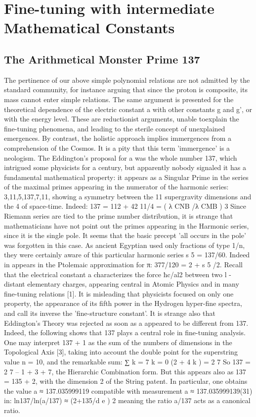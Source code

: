 \chapter{Fine-tuning with intermediate Mathematical Constants}

\section {The Arithmetical Monster Prime 137}

The pertinence of our above simple polynomial relations are not admitted by the standard
community, for instance arguing that since the proton is composite, its mass cannot enter simple
relations. The same argument is presented for the theoretical dependence of the electric constant a
with other constants g and g', or with the energy level. These are reductionist arguments, unable toexplain the fine-tuning phenomena, and leading to the sterile concept of unexplained emergences.
By contrast, the holistic approach implies immergences from a comprehension of the Cosmos. It is a
pity that this term 'immergence' is a neologism.
The Eddington's proposal for a was the whole number 137, which intrigued some physicists for a
century, but apparently nobody signaled it has a fundamental mathematical property: it appears as a
Singular Prime in the series of the maximal primes appearing in the numerator of the harmonic
series: 3,11,5,137,7,11, showing a symmetry between the 11 supergravity dimensions and the 4 of
space-time. Indeed:
137 = 112 + 42
11/4 = ( λ CNB /λ CMB ) 3
Since Riemann series are tied to the prime number distribution, it is strange that mathematicians
have not point out the primes appearing in the Harmonic series, since it is the single pole. It seems
that the basic precept 'all occurs in the pole' was forgotten in this case. As ancient Egyptian used
only fractions of type 1/n, they were certainly aware of this particular harmonic series s 5 = 137/60.
Indeed in appears in the Ptolemaic approximation for π: 377/120 = 2 + s 5 /2.
Recall that the electrical constant a characterizes the force ħc/al2 between two l - distant
elementary charges, appearing central in Atomic Physics and in many fine-tuning relations [1]. It is
misleading that physicists focused on only one property, the appearance of its fifth power in the
Hydrogen hyper-fine spectra, and call its inverse the 'fine-structure constant'. It is strange also that
Eddington's Theory was rejected as soon as a appeared to be different from 137. Indeed, the
following shows that 137 plays a central role in fine-tuning analysis. One may interpret 137 + 1 as
the sum of the numbers of dimensions in the Topological Axis [3], taking into account the double
point for the superstring value n = 10, and the remarkable sum:
∑
k = 7
k = 0
(2 + 4 k ) = 2 7
So 137 = 2 7 – 1 + 3 + 7, the Hierarchic Combination form. But this appears also as 137 = 135 + 2,
with the dimension 2 of the String patent. In particular, one obtains the value a ≈ 137.035999119
compatible with measurement a ≈ 137.035999139(31) in:
ln137/ln(a/137) ≈ (2+135/d e ) 2
meaning the ratio a/137 acts as a canonical ratio.

